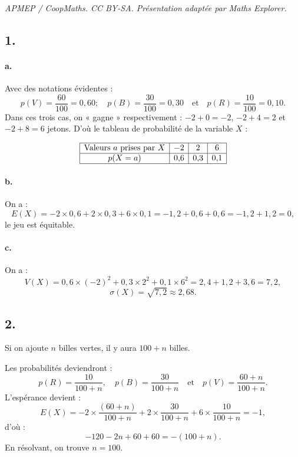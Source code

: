 \documentclass[10pt]{article}
\begin{document}
\noindent\textit{APMEP / CoopMaths. CC BY-SA. Présentation adaptée par Maths Explorer.}\par\medskip
\subsection*{1.}

\paragraph{a.} Avec des notations évidentes :
\[
p(V) = \dfrac{60}{100} = 0{,}60 ; \quad p(B) = \dfrac{30}{100} = 0{,}30 \quad \text{et} \quad p(R) = \dfrac{10}{100} = 0{,}10.
\]
Dans ces trois cas, on « gagne » respectivement : \( -2 + 0 = -2 \), \( -2 + 4 = 2 \) et \( -2 + 8 = 6 \) jetons. D'où le tableau de probabilité de la variable \( X \) :

\[
\begin{array}{|c|c|c|c|}
\hline
\text{Valeurs } a \text{ prises par } X & -2 & 2 & 6 \\
\hline
p(X = a) & 0{,}6 & 0{,}3 & 0{,}1 \\
\hline
\end{array}
\]

\paragraph{b.} On a :
\[
E(X) = -2 \times 0{,}6 + 2 \times 0{,}3 + 6 \times 0{,}1 = -1{,}2 + 0{,}6 + 0{,}6 = -1{,}2 + 1{,}2 = 0,
\]
le jeu est équitable.

\paragraph{c.} On a :
\[
V(X) = 0{,}6 \times (-2)^2 + 0{,}3 \times 2^2 + 0{,}1 \times 6^2 = 2{,}4 + 1{,}2 + 3{,}6 = 7{,}2,
\]
\[
\sigma(X) = \sqrt{7{,}2} \approx 2{,}68.
\]

\subsection*{2.}

Si on ajoute \( n \) billes vertes, il y aura \( 100 + n \) billes.

Les probabilités deviendront :
\[
p(R) = \dfrac{10}{100 + n}, \quad p(B) = \dfrac{30}{100 + n} \quad \text{et} \quad p(V) = \dfrac{60 + n}{100 + n}.
\]
L'espérance devient :
\[
E(X) = -2 \times \dfrac{(60 + n)}{100 + n} + 2 \times \dfrac{30}{100 + n} + 6 \times \dfrac{10}{100 + n} = -1,
\]
d'où :
\[
-120 - 2n + 60 + 60 = -(100 + n).
\]
En résolvant, on trouve \( n = 100 \).
\end{document}
